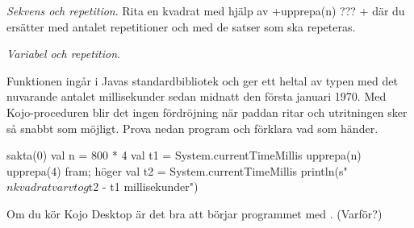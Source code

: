 %
%

\vspace{1em}



\Task \textit{Sekvens och repetition}. Rita en kvadrat med hjälp av \code+upprepa(n){ ??? }+ där du ersätter  med antalet repetitioner och  med de satser som ska repeteras.






\Task \textit{Variabel och repetition}.

\Subtask Funktionen  ingår i Javas standardbibliotek och ger ett heltal av typen  med det nuvarande antalet millisekunder sedan midnatt den första januari 1970.  Med Kojo-proceduren  blir det ingen fördröjning när paddan ritar och utritningen sker så snabbt som möjligt. Prova nedan program och förklara vad som händer.
\begin{Code}
sakta(0)
val n = 800 * 4
val t1 = System.currentTimeMillis
upprepa(n){ upprepa(4){ fram; höger } }
val t2 = System.currentTimeMillis
println(s"$n kvadratvarv tog ${t2 - t1} millisekunder")
\end{Code}
\noindent Om du kör Kojo Desktop är det bra att börjar programmet med . (Varför?)

